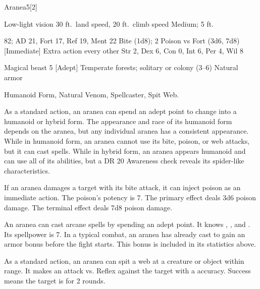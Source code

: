     \begin{monsection}{Aranea}{5}[2]
        \begin{spellcontent}
            \begin{spelltargetinginfo}
                \pari {} Low-light vision
                \pari {} 30 ft.\ land speed, 20 ft.\ climb speed
                \pari {} Medium;  5 ft.
            \end{spelltargetinginfo}
            \begin{spelleffects}
                \pari {} 82;  AD 21, Fort 17, Ref 19, Ment 22
                \pari {} Bite  (1d8);  2
                \pari {} Poison  vs Fort (3d6, 7d8) [Immediate]
                \pari {} Extra action every other 
                \pari {} Str 2, Dex 6, Con 0, Int 6, Per 4, Wil 8
            \end{spelleffects}
        \end{spellcontent}
        \begin{spellfooter}
            \pari {} Magical beast 5 [Adept]
            \pari {} Temperate forests; solitary or colony (3--6)
            \pari {} Natural armor 
        \end{spellfooter}
    \end{monsection}
     Humanoid Form, Natural Venom, Spellcaster, Spit Web.


     As a standard action, an aranea can spend an adept point to change into a humanoid or hybrid form.
    The appearance and race of its humanoid form depends on the aranea, but any individual aranea has a consistent appearance.
    While in humanoid form, an aranea cannot use its bite, poison, or web attacks, but it can cast spells.
    While in hybrid form, an aranea appears humanoid and can use all of its abilities, but a DR 20 Awareness check reveals its spider-like characteristics.

     If an aranea damages a target with its bite attack, it can inject poison as an immediate action.
    The poison's potency is 7.
    The primary effect deals 3d6 poison damage.
    The terminal effect deals 7d8 poison damage.

     An aranea can cast arcane spells by spending an adept point.
    It knows , , and .
    Its spellpower is 7.
    In a typical combat, an aranea has already cast  to gain an armor bonus before the fight starts.
    This bonus is included in its statistics above.

     As a standard action, an aranea can spit a web at a creature or object within \rngmed range.
    It makes an attack vs. Reflex against the target with a  accuracy.
    Success means the target is \immobilized for 2 rounds.
